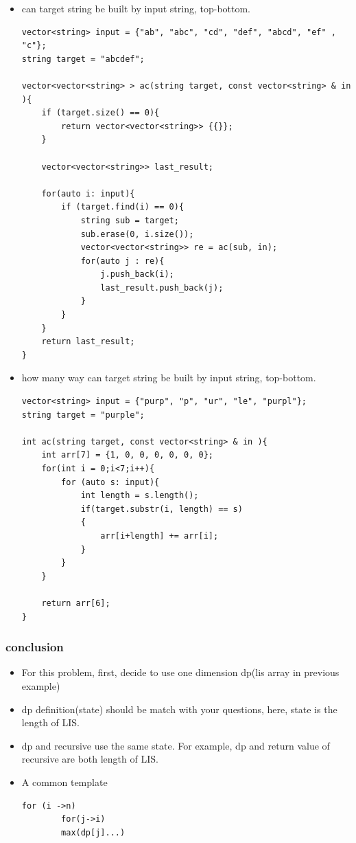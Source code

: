 \documentclass[a4paper,11pt,twoside]{book}
\begin{document}
\begin{itemize}
\item can target string be built by input string, top-bottom.

\begin{lstlisting}[numbers=none]
vector<string> input = {"ab", "abc", "cd", "def", "abcd", "ef" , "c"};
string target = "abcdef";

vector<vector<string> > ac(string target, const vector<string> & in ){
	if (target.size() == 0){
		return vector<vector<string>> {{}};
	}
	
	vector<vector<string>> last_result;
	
	for(auto i: input){
		if (target.find(i) == 0){
			string sub = target;
			sub.erase(0, i.size());
			vector<vector<string>> re = ac(sub, in);
			for(auto j : re){
				j.push_back(i);
				last_result.push_back(j);
			}
		}
	}
	return last_result;
}
\end{lstlisting} 

\item how many way can target string be built by input string, top-bottom.
\begin{lstlisting}[numbers=none]
vector<string> input = {"purp", "p", "ur", "le", "purpl"};
string target = "purple";

int ac(string target, const vector<string> & in ){	
	int arr[7] = {1, 0, 0, 0, 0, 0, 0};
	for(int i = 0;i<7;i++){
		for (auto s: input){
			int length = s.length();
			if(target.substr(i, length) == s)
			{
				arr[i+length] += arr[i];
			}		
		}
	}

	return arr[6];
}
\end{lstlisting} 

\end{itemize}

\subsubsection{conclusion}
\begin{itemize}
	\item For this problem, first, decide to use one dimension dp(lis array in previous example)
	\item dp definition(state) should be match with your questions, here, state is the length of LIS. 
	\item dp and recursive use the same state. For example, dp and return value of recursive are both length of LIS.
	\item A common template
	\begin{lstlisting}[numbers=none]
		for (i ->n)
		for(j->i)
		max(dp[j]...)
	\end{lstlisting}

\end{itemize}
\end{document}
